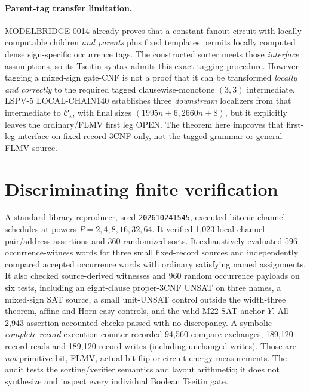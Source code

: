 \documentclass[11pt]{article}
\begin{document}
\paragraph{Parent-tag transfer limitation.}
MODELBRIDGE-0014 already proves that a constant-fanout circuit with locally computable children \emph{and parents} plus fixed templates permits locally computed dense sign-specific occurrence tags. The constructed sorter meets those \emph{interface} assumptions, so its Tseitin syntax admits this exact tagging procedure. However tagging a mixed-sign gate-CNF is not a proof that it can be transformed \emph{locally and correctly} to the required tagged clausewise-monotone $(3,3)$ intermediate. LSPV-5 LOCAL-CHAIN140 establishes three \emph{downstream} localizers from that intermediate to $\mathcal C_\star$, with final sizes $(1995n+6,2660n+8)$, but it explicitly leaves the ordinary/FLMV first leg OPEN. The theorem here improves that first-leg interface on fixed-record 3CNF only, not the tagged grammar or general FLMV source.

\section{Discriminating finite verification}
A standard-library reproducer, seed \texttt{202610241545}, executed bitonic channel schedules at powers $P=2,4,8,16,32,64$. It verified 1,023 local channel-pair/address assertions and 360 randomized sorts. It exhaustively evaluated 596 occurrence-witness words for three small fixed-record sources and independently compared accepted occurrence words with ordinary satisfying named assignments. It also checked source-derived witnesses and 960 random occurrence payloads on six tests, including an eight-clause proper-3CNF UNSAT on three names, a mixed-sign SAT source, a small unit-UNSAT control outside the width-three theorem, affine and Horn easy controls, and the valid M22 SAT anchor $Y$. All 2,943 assertion-accounted checks passed with no discrepancy. A symbolic \emph{complete-record} execution counter recorded 94,560 compare-exchanges, 189,120 record reads and 189,120 record writes (including unchanged writes). Those are \emph{not} primitive-bit, FLMV, actual-bit-flip or circuit-energy measurements. The audit tests the sorting/verifier semantics and layout arithmetic; it does not synthesize and inspect every individual Boolean Tseitin gate.
\end{document}
